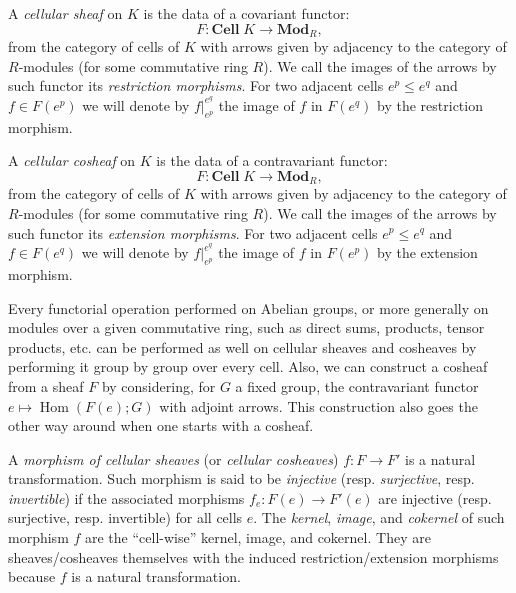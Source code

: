 \documentclass[AHL,Unicode,longabstracts,published]{cedram}
\DeclareMathOperator{\Hom}{Hom}
\newcommand{\Cell}{\mathbf{Cell}}
\newcommand{\Mod}{\mathbf{Mod}}
\begin{document}
\begin{defi}
A \emph{cellular sheaf} on $K$ is the data of a covariant functor:
\begin{equation*}
F:\Cell\;K\rightarrow \Mod_R,
\end{equation*}
from the category of cells of $K$ with arrows given by adjacency to the category of $R$-modules (for some commutative ring $R$). We call the images of the arrows by such functor its \emph{restriction morphisms}. For two adjacent cells $e^p\leq e^q$ and $f\in F(e^p)$ we will denote by $f|^{e^q}_{e^p}$ the image of $f$ in $F(e^q)$ by the restriction morphism.
\end{defi}


\begin{defi}
A \emph{cellular cosheaf} on $K$ is the data of a contravariant functor:
\begin{equation*}
F:\Cell\;K\rightarrow \Mod_R,
\end{equation*}
from the category of cells of $K$ with arrows given by adjacency to the category of $R$-modules (for some commutative ring $R$). We call the images of the arrows by such functor its \emph{extension morphisms}. For two adjacent cells $e^p\leq e^q$ and $f\in F(e^q)$ we will denote by $f|^{e^q}_{e^p}$ the image of $f$ in $F(e^p)$ by the extension morphism.
\end{defi}

Every functorial operation performed on Abelian groups, or more generally on modules over a given commutative ring, such as direct sums, products, tensor products, etc. can be performed as well on cellular sheaves and cosheaves by performing it group by group over every cell. Also, we can construct a cosheaf from a sheaf $F$ by considering, for $G$ a fixed group, the contravariant functor $e\mapsto \Hom(F(e);G)$ with adjoint arrows. This construction also goes the other way around when one starts with a cosheaf.

\begin{defi}
A \emph{morphism of cellular sheaves} (or \emph{cellular cosheaves}) $f:F\rightarrow F'$ is a natural transformation. Such morphism is said to be \emph{injective} (resp. \emph{surjective}, resp. \emph{invertible}) if the associated morphisms $f_e:F(e)\rightarrow F'(e)$ are injective (resp. surjective, resp. invertible) for all cells $e$. The \emph{kernel}, \emph{image}, and \emph{cokernel} of such morphism $f$ are the ``cell-wise'' kernel, image, and cokernel. They are sheaves/cosheaves themselves with the induced restriction/extension morphisms because $f$ is a natural transformation.
\end{defi}
\end{document}
